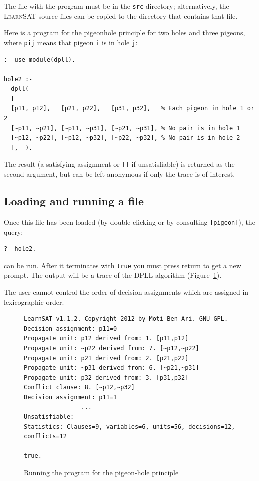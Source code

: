 \documentclass[11pt]{report}
\newcommand*{\p}[1]{\textup{\texttt{#1}}}
\newcommand*{\ls}{\textsc{LearnSAT}}
\begin{document}
The file with the program must be in the \p{src} directory;
alternatively, the \ls{} source files can be copied to the directory
that contains that file.

Here is a program for the pigeonhole principle for two holes and three
pigeons, where \p{pij} means that pigeon \p{i} is in hole \p{j}:

\begin{verbatim}
:- use_module(dpll).

hole2 :-
  dpll(
  [
  [p11, p12],   [p21, p22],   [p31, p32],   % Each pigeon in hole 1 or 2 
  [~p11, ~p21], [~p11, ~p31], [~p21, ~p31], % No pair is in hole 1
  [~p12, ~p22], [~p12, ~p32], [~p22, ~p32], % No pair is in hole 2
  ], _).
\end{verbatim}

The result (a satisfying assignment or \p{[]} if unsatisfiable) is
returned as the second argument, but can be left anonymous if only
the trace is of interest.

\subsection{Loading and running a file}

Once this file has been loaded (by double-clicking or by consulting
\p{[pigeon]}), the query:
\begin{verbatim}
?- hole2. 
\end{verbatim}

can be run. After it terminates with \p{true} you must press
return to get a new prompt. The output will be a trace of the DPLL
algorithm (Figure~\ref{fig.pigeon}).

The user cannot control the order of decision assignments which are
assigned in lexicographic order.

\begin{figure}[tbp]
\begin{verbatim}
LearnSAT v1.1.2. Copyright 2012 by Moti Ben-Ari. GNU GPL.
Decision assignment: p11=0
Propagate unit: p12 derived from: 1. [p11,p12]
Propagate unit: ~p22 derived from: 7. [~p12,~p22]
Propagate unit: p21 derived from: 2. [p21,p22]
Propagate unit: ~p31 derived from: 6. [~p21,~p31]
Propagate unit: p32 derived from: 3. [p31,p32]
Conflict clause: 8. [~p12,~p32]
Decision assignment: p11=1
                ...
Unsatisfiable:
Statistics: Clauses=9, variables=6, units=56, decisions=12, conflicts=12

true.
\end{verbatim}
\caption{Running the program for the pigeon-hole principle}\label{fig.pigeon}
\end{figure}
\end{document}
